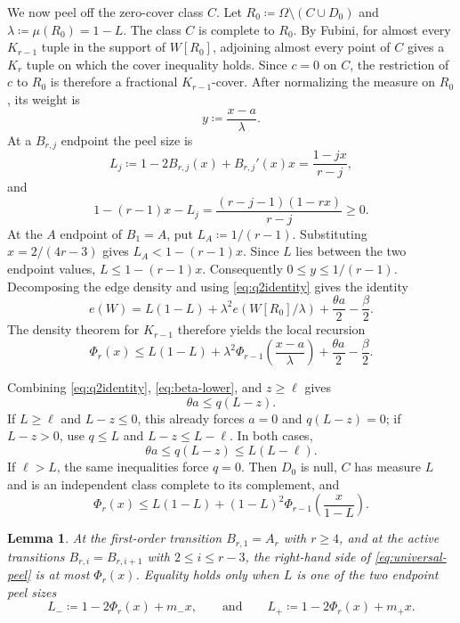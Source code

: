 \documentclass[10pt]{article}
\numberwithin{equation}{section}
\newtheorem{lemma}[lemma]{Lemma}
\begin{document}
We now peel off the zero-cover class $C$.  Let $R_0\coloneqq\Omega\setminus(C\cup D_0)$ and $\lambda\coloneqq\mu(R_0)=1-L$.  The class $C$ is complete to $R_0$.  By Fubini, for almost every $K_{r-1}$ tuple in the support of $W[R_0]$, adjoining almost every point of $C$ gives a $K_r$ tuple on which the cover inequality holds.  Since $c=0$ on $C$, the restriction of $c$ to $R_0$ is therefore a fractional $K_{r-1}$-cover.  After normalizing the measure on $R_0$, its weight is
\[
 y\coloneqq\frac{x-a}{\lambda}.
\]
At a $B_{r,j}$ endpoint the peel size is
\[
 L_j\coloneqq1-2B_{r,j}(x)+B_{r,j}'(x)x
 =\frac{1-jx}{r-j},
\]
and
\[
 1-(r-1)x-L_j
 =\frac{(r-j-1)(1-rx)}{r-j}\ge0.
\]
At the $A$ endpoint of $B_1=A$, put $L_A\coloneqq1/(r-1)$.  Substituting $x=2/(4r-3)$ gives $L_A<1-(r-1)x$.  Since $L$ lies between the two endpoint values, $L\le1-(r-1)x$.  Consequently $0\le y\le1/(r-1)$.  Decomposing the edge density and using \cref{eq:q2identity} gives the identity
\begin{equation}\label{eq:local-decomposition}
 e(W)=L(1-L)+\lambda^2e(W[R_0]/\lambda)
 +\frac{\theta a}{2}-\frac\beta2.
\end{equation}
The density theorem for $K_{r-1}$ therefore yields the local recursion
\begin{equation}\label{eq:local-recursion}
 \Phi_r(x)
 \le L(1-L)+\lambda^2\Phi_{r-1}\left(\frac{x-a}{\lambda}\right)
 +\frac{\theta a}{2}-\frac\beta2.
\end{equation}

Combining \cref{eq:q2identity}, \cref{eq:beta-lower}, and $z\ge\ell$ gives
\[
 \theta a\le q(L-z).
\]
If $L\ge\ell$ and $L-z\le0$, this already forces $a=0$ and $q(L-z)=0$; if $L-z>0$, use $q\le L$ and $L-z\le L-\ell$.  In both cases,
\begin{equation}\label{eq:a-upper-general}
 \theta a\le q(L-z)\le L(L-\ell).
\end{equation}
If $\ell>L$, the same inequalities force $q=0$.  Then $D_0$ is null, $C$ has measure $L$ and is an independent class complete to its complement, and
\begin{equation}\label{eq:universal-peel}
 \Phi_r(x)\le L(1-L)+(1-L)^2\Phi_{r-1}\left(\frac{x}{1-L}\right).
\end{equation}

\begin{lemma}\label{lem:Bellman-equality}
At the first-order transition $B_{r,1}=A_r$ with $r\ge4$, and at the active transitions $B_{r,i}=B_{r,i+1}$ with $2\le i\le r-3$, the right-hand side of \cref{eq:universal-peel} is at most $\Phi_r(x)$.  Equality holds only when $L$ is one of the two endpoint peel sizes
\[
 L_-\coloneqq1-2\Phi_r(x)+m_-x,
 \qquad\text{and}\qquad
 L_+\coloneqq1-2\Phi_r(x)+m_+x.
\]
\end{lemma}
\end{document}
